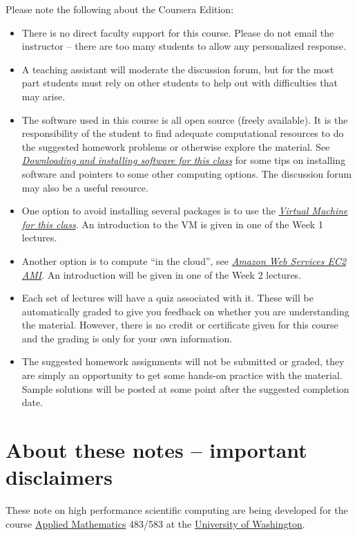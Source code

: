 \documentclass[letterpaper,10pt,english]{sphinxmanual}
\begin{document}
Please note the following about the Coursera Edition:
\begin{itemize}
\item {} 
There is no direct faculty support for this course.  Please do not email
the instructor -- there are too many students to allow any personalized
response.

\item {} 
A teaching assistant will moderate the discussion forum, but for the most
part students must rely on other students to help out with difficulties
that may arise.

\item {} 
The software used in this course is all open source (freely available).
It is the responsibility of the student to find
adequate computational resources to do the suggested homework
problems or otherwise explore the material.   See
{\hyperref[software_installation:software-installation]{\emph{Downloading and installing software for this class}}} for some tips on installing software
and pointers to some other computing options.  The discussion
forum may also be a useful resource.

\item {} 
One option to avoid  installing several packages is to use the
{\hyperref[vm:vm]{\emph{Virtual Machine for this class}}}.  An introduction to the VM is given in one of the Week 1
lectures.

\item {} 
Another option is to compute ``in the cloud'', see {\hyperref[aws:aws]{\emph{Amazon Web Services EC2 AMI}}}.
An introduction will be given in one of the Week 2 lectures.

\item {} 
Each set of lectures will have a quiz associated with it. These will be
automatically graded to give you feedback on whether you are understanding
the material.  However, there is no credit or certificate given for this
course and the grading is only for your own information.

\item {} 
The suggested homework assignments will not be submitted or graded, they
are simply an opportunity to get some hands-on practice with the material.
Sample solutions will be posted at some point after the suggested
completion date.

\end{itemize}


\section{About these notes -- important disclaimers}
\label{about:about-these-notes-important-disclaimers}\label{about:about}\label{about::doc}
These note on high performance scientific computing are being developed for
the course \href{http://www.amath.washington.edu/}{Applied Mathematics} 483/583
at the \href{http://www.washington.edu}{University of Washington}.
\end{document}
